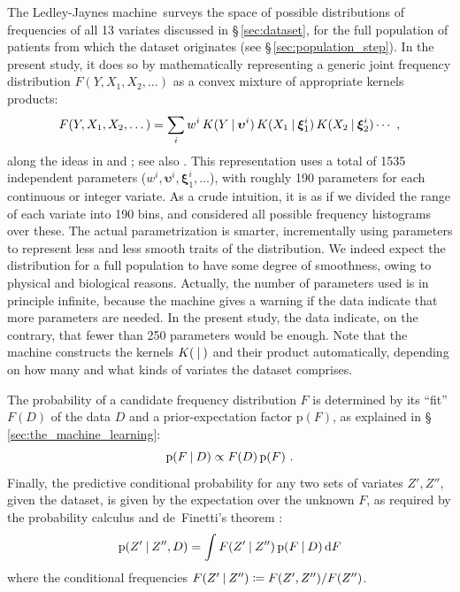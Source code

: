 \documentclass[utf8]{FrontiersinHarvard_mod} %
\newcommand*{\sect}{\S}%
\newcommand*{\p}{\mathrm{p}}%
\renewcommand*{\|}[1][]{\nonscript\:#1\vert\nonscript\:\mathopen{}}
\newcommand*{\di}{\mathrm{d}}
\newcommand*{\defd}{\coloneqq}
\newcommand*{\ljm}{Ledley-Jaynes machine}
\begin{document}
The \ljm\ surveys the space of possible distributions of frequencies of all 13 variates discussed in \sect\,\ref{sec:dataset}, for the full population of patients from which the dataset originates (see \sect\,\ref{sec:population_step}). In the present study, it does so by mathematically representing a generic joint frequency distribution $F(Y,X_1,X_2,\dotsc)$ as a convex mixture of appropriate kernels products:
\begin{equation*}
F(Y,X_1,X_2,\dotsc) = \sum_i w^{i}\, K(Y\|\bm{\upsilon}^{i})\,
K(X_1\|\bm{\xi}_1^{i})\, K(X_2\|\bm{\xi}_2^{i})\dotsm\ ,
\end{equation*}
along the ideas in \citet{dunsonetal2011} and \citet{ishwaranetal2002b}; see also \citet{rossi2014,rasmussen1999}. This representation uses a total of 1535 independent parameters ($w^{i}, \bm{\upsilon}^{i}, \bm{\xi}^{i}_{1}, \dotsc$), with roughly 190 parameters for each continuous or integer variate. As a crude intuition, it is as if we divided the range of each variate into 190 bins, and considered all possible frequency histograms over these. The actual parametrization is smarter, incrementally using parameters to represent less and less smooth traits of the distribution. We indeed expect the distribution for a full population to have some degree of smoothness, owing to physical and biological reasons. Actually, the number of parameters used is in principle infinite, because the machine gives a warning if the data indicate that more parameters are needed. In the present study, the data indicate, on the contrary, that fewer than 250 parameters would be enough. Note that the machine constructs the kernels $K(\|)$ and their product automatically, depending on how many and what kinds of variates the dataset comprises.

The probability of a candidate frequency distribution $F$ is determined by its \enquote{fit} $F(D)$ of the data $D$ and a prior-expectation factor $\p(F)$, as explained in \sect\,\ref{sec:the_machine_learning}:
\begin{equation*}
  \p(F\| D) \propto F(D)\, \p(F) \ .
\end{equation*}
Finally, the predictive conditional probability for any two sets of variates $Z',Z''$, given the dataset, is given by the expectation over the unknown $F$, as required by the probability calculus and de~Finetti's theorem \citep[\sect\,4.6]{bernardoetal1994_r2000}:
\begin{equation*}
  \p(Z' \| Z'', D) = \int F(Z' \| Z'')\, \p(F\|D)\, \di F
\end{equation*}
where the conditional frequencies $F(Z'\|Z'') \defd F(Z',Z'')/F(Z'')$.
\end{document}
